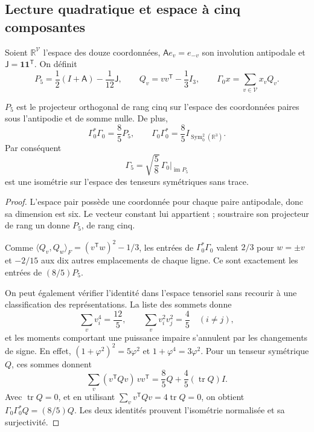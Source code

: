 \subsection{Lecture quadratique et espace à cinq composantes}
Soient \(\mathbb R^{\mathcal V}\) l'espace des douze coordonnées,
\(\mathsf A e_v=e_{-v}\) son involution antipodale et
\(\mathsf J=\mathbf1\mathbf1^{\mathsf T}\). On définit
\[
 P_5=\frac12(I+\mathsf A)-\frac1{12}\mathsf J,\qquad
 Q_v=vv^{\mathsf T}-\frac13I_3,\qquad
 \Gamma_0x=\sum_{v\in\mathcal V}x_vQ_v.
\]
\begin{theorem}
\label{vii:thm:portador-pentacomponente}
\(P_5\) est le projecteur orthogonal de rang cinq sur l'espace des
coordonnées paires sous l'antipodie et de somme nulle. De plus,
\[
 \Gamma_0^*\Gamma_0=\frac85P_5,\qquad
 \Gamma_0\Gamma_0^*=\frac85I_{\operatorname{Sym}^2_0(\mathbb R^3)}.
\]
Par conséquent
\[
 \Gamma_5=\sqrt{\frac58}\,\Gamma_0|_{\operatorname{im}P_5}
\]
est une isométrie sur l'espace des tenseurs symétriques sans trace.
\end{theorem}
\begin{proof}
L'espace pair possède une coordonnée pour chaque paire antipodale, donc
sa dimension est six. Le vecteur constant lui appartient ; soustraire son
projecteur de rang un donne \(P_5\), de rang cinq.

Comme
\(\langle Q_v,Q_w\rangle_F=(v^{\mathsf T}w)^2-1/3\), les entrées
de \(\Gamma_0^*\Gamma_0\) valent \(2/3\) pour \(w=\pm v\) et
\(-2/15\) aux dix autres emplacements de chaque ligne. Ce sont
exactement les entrées de \((8/5)P_5\).

On peut également vérifier l'identité dans l'espace tensoriel sans recourir à une classification des représentations. La liste des sommets donne
\[
 \sum_vv_i^4=\frac{12}{5},\qquad
 \sum_vv_i^2v_j^2=\frac45\quad(i\ne j),
\]
et les moments comportant une puissance impaire s'annulent par les changements de signe. En effet, \((1+\varphi^2)^2=5\varphi^2\) et \(1+\varphi^4=3\varphi^2\). Pour un tenseur symétrique \(Q\), ces sommes donnent
\[
 \sum_v(v^{\mathsf T}Qv)\,vv^{\mathsf T}
 =\frac85Q+\frac45(\operatorname{tr}Q)I.
\]
Avec \(\operatorname{tr}Q=0\), et en utilisant
\(\sum_vv^{\mathsf T}Qv=4\operatorname{tr}Q=0\), on obtient
\(\Gamma_0\Gamma_0^*Q=(8/5)Q\). Les deux identités prouvent
l'isométrie normalisée et sa surjectivité.
\end{proof}


